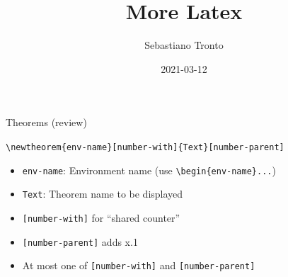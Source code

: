 \documentclass[11pt]{beamer}
\author[\texttt{sebastiano.tronto@uni.lu}]{Sebastiano Tronto}
\title{More Latex}
\date{2021-03-12}
\newcommand{\bs}{\textbackslash}
\begin{document}
\begin{frame}
  \titlepage
\end{frame}

\begin{frame}{Theorems (review)}
  \begin{center}
    \large
    \texttt{\bs newtheorem\{env-name\}{\color{red}[number-with]}\{Text\}{\color{red}[number-parent]}}
  \end{center}

  \vspace{0.4cm}
  \begin{itemize}
    \item \texttt{env-name}: Environment name (use
          \texttt{\bs begin\{env-name\}...})
    \item \texttt{Text}: Theorem name to be displayed
    \item \texttt{[number-with]} for ``shared counter''
    \item \texttt{[number-parent]} adds x.1
    \item {\color{red} At most one of \texttt{[number-with]}
           and \texttt{[number-parent]}}
  \end{itemize}
  
\end{frame}
\end{document}
